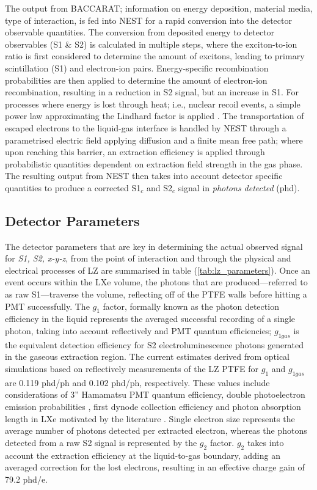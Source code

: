 The output from \textsc{BACCARAT}; information on energy deposition, material media, type of interaction, is fed into NEST for a rapid conversion into the detector observable quantities. The conversion from deposited energy to detector observables (S1 \& S2) is calculated in multiple steps, where the exciton-to-ion ratio is first considered to determine the amount of excitons, leading to primary scintillation (S1) and electron-ion pairs. Energy-specific recombination probabilities are then applied to determine the amount of electron-ion recombination, resulting in a reduction in S2 signal, but an increase in S1. For processes where energy is lost through heat; i.e., nuclear recoil events, a simple power law approximating the Lindhard factor is applied \cite{Lindhard, Lindhard_2}. The transportation of escaped electrons to the liquid-gas interface is handled by NEST through a parametrised electric field applying diffusion and a finite mean free path; where upon reaching this barrier, an extraction efficiency is applied through probabilistic quantities dependent on extraction field strength in the gas phase. The resulting output from NEST then takes into account detector specific quantities to produce a corrected S1$_{c}$ and S2$_{c}$ signal in \textit{photons detected} (phd).


\subsection{Detector Parameters}
\label{secsec:detector_param}

%

%

The detector parameters that are key in determining the actual observed signal for \textit{S1, S2, x-y-z}, from the point of interaction and through the physical and electrical processes of LZ are summarised in table (\ref{tab:lz_parameters}). Once an event occurs within the LXe volume, the photons that are produced---referred to as raw S1---traverse the volume, reflecting off of the PTFE walls before hitting a PMT successfully. The $g_{1}$ factor, formally known as the photon detection efficiency in the liquid represents the averaged successful recording of a single photon, taking into account reflectively and PMT quantum efficiencies; $g_{1gas}$ is the equivalent detection efficiency for S2 electroluminescence photons generated in the gaseous extraction region. The current estimates derived from optical simulations based on reflectively measurements of the LZ PTFE \cite{Neves_2017, Haefner_2017} for $g_{1}$ and $g_{1gas}$ are 0.119 phd/ph and 0.102 phd/ph, respectively. These values include considerations of 3'' Hamamatsu PMT quantum efficiency, double photoelectron emission probabilities \cite{L_pez_Paredes_2018}, first dynode collection efficiency and photon absorption length in LXe motivated by the literature \cite{lux_signal_yields}. Single electron size represents the average number of photons detected per extracted electron, whereas the photons detected from a raw S2 signal is represented by the $g_{2}$ factor. $g_{2}$ takes into account the extraction efficiency at the liquid-to-gas boundary, adding an averaged correction for the lost electrons, resulting in an effective charge gain of 79.2 phd/e.


